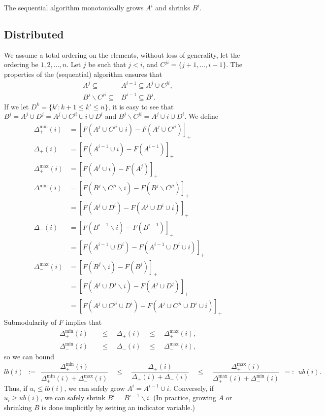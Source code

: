 \documentclass{article} %
\begin{document}
The sequential algorithm monotonically grows $A^i$ and shrinks $B^i$.

\subsection{Distributed}
We assume a total ordering on the elements, without loss of generality, let the ordering be $1,2,\dots,n$.
Let $j$ be such that $j<i$, and $C^{ji} = \{j+1,\dots,i-1\}$.
The properties of the (sequential) algorithm ensures that
\begin{align*}
A^j \subseteq &A^{i-1} \subseteq A^j\cup C^{ji},\\
B^j\backslash C^{ji} \subseteq &B^{i-1} \subseteq B^j.
\end{align*}
If we let $D^k = \{k': k+1 \leq k' \leq n\}$,
it is easy to see that $B^j = A^j \cup D^j = A^j \cup C^{ji} \cup i \cup D^i$ and $B^j\backslash C^{ji} = A^j \cup i \cup D^i$.
We define
\begin{align*}
\Delta_{+}^{\min}(i) &= [F(A^j\cup C^{ji}\cup i) - F(A^j\cup C^{ji})]_+\\
\Delta_{+}       (i) &= [F(A^{i-1}\cup i) - F(A^{i-1})]_+\\
\Delta_{+}^{\max}(i) &= [F(A^j\cup i) - F(A^j)]_+\\
\Delta_{-}^{\min}(i) &= [F(B^j\backslash C^{ji}\backslash i) - F(B^j\backslash C^{ji})]_+\\
                            &= [F(A^j\cup D^i) - F(A^j\cup D^i \cup i)]_+\\
\Delta_{-}       (i) &= [F(B^{i-1}\backslash i) - F(B^{i-1})]_+\\
                            &= [F(A^{i-1}\cup D^i) - F(A^{i-1}\cup D^i \cup i)]_+\\
\Delta_{-}^{\max}(i) &= [F(B^j\backslash i) - F(B^j)]_+\\
                            &= [F(A^j\cup D^j\backslash i) - F(A^j\cup D^j)]_+\\
                            &= [F(A^j\cup C^{ji}\cup D^i) - F(A^j\cup C^{ji}\cup D^i \cup i)]_+
\end{align*}
Submodularity of $F$ implies that
\begin{align*}
\Delta_{+}^{\min}(i) &\quad\leq\quad \Delta_{+}(i) \quad\leq\quad \Delta_{+}^{\max}(i),\\
\Delta_{-}^{\min}(i) &\quad\leq\quad \Delta_{-}(i) \quad\leq\quad \Delta_{-}^{\max}(i),
\end{align*}
so we can bound
\begin{equation*}
lb(i) ~~:=~~
\frac{\Delta_{+}^{\min}(i)}{\Delta_{+}^{\min}(i) + \Delta_{-}^{\max}(i)}
\quad\leq\quad 
\frac{\Delta_{+}(i)}{\Delta_{+}(i) + \Delta_{-}(i)}
\quad\leq\quad 
\frac{\Delta_{+}^{\max}(i)}{\Delta_{+}^{\max}(i) + \Delta_{-}^{\min}(i)}
~~=:~~ ub(i).
\end{equation*}
Thus, if $u_i \leq lb(i)$, we can safely grow $A^i = A^{i-1} \cup i$.
Conversely, if $u_i \geq ub(i)$, we can safely shrink $B^i = B^{i-1} \backslash i$.
(In practice, growing $A$ or shrinking $B$ is done implicitly by setting an indicator variable.)
\end{document}
